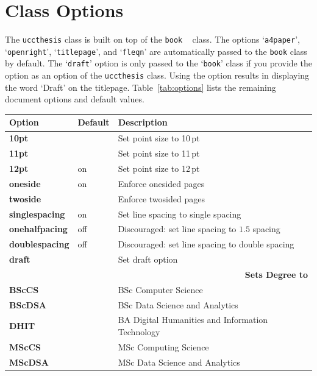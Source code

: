 \documentclass[MScCS]{uccthesis}
\begin{document}
   \section{Class Options}
      The \texttt{uccthesis}
       class is built on top of the \texttt{book}%
       ~\parencite{Lamport:94} class.
      The options
       `\texttt{a4paper}',
       `\texttt{openright}',
       `\texttt{titlepage}', and
       `\texttt{fleqn}'
       are automatically passed to the \texttt{book} class by default.
      The `\texttt{draft}' option is only passed to
       the `\texttt{book}' class if you provide the option
       as an option of the \texttt{uccthesis} class.
      Using the option
       results in displaying the word `Draft' on the titlepage.
      Table~\ref{tab:options} lists the remaining document options
       and default values.
      \begin{table}[tbp]
      \begin{tabular}{lll}
        \toprule
        \textbf{Option}   & \textbf{Default} & \textbf{Description}
      \\\midrule
        \textbf{10pt}     &     & Set point size to 10\,pt
      \\\textbf{11pt}     &     & Set point size to 11\,pt
      \\\textbf{12pt}     & on  & Set point size to 12\,pt
      \\\textbf{oneside}  & on  & Enforce onesided pages
      \\\textbf{twoside}  &     & Enforce twosided pages
      \\\textbf{singlespacing} & on & Set line spacing to single spacing
      \\\textbf{onehalfpacing} & off & Discouraged: set line spacing to $1.5$ spacing
      \\\textbf{doublespacing} & off & Discouraged: set line spacing to double spacing
      \\\textbf{draft}    &     & Set draft option
      \\\midrule
        \multicolumn{3}{r}{\textbf{Sets Degree to}}
      \\\midrule
        \textbf{BScCS}    &     & BSc Computer Science
      \\\textbf{BScDSA}   &     & BSc Data Science and Analytics
      \\\textbf{DHIT}     &     & BA Digital Humanities and Information Technology
      \\\textbf{MScCS}    &     & MSc Computing Science
      \\\textbf{MScDSA}   &     & MSc Data Science and Analytics

\end{tabular}
\end{table}
\end{document}
